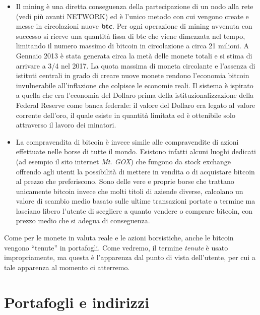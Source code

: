 \begin{itemize}
\item
  Il mining è una diretta conseguenza della partecipazione di un nodo   alla rete (vedi più avanti NETWORK) ed è l'unico metodo con cui   vengono create e messe in circolazioni nuove \textbf{btc}. Per ogni   operazione di mining avvenuta con successo si riceve una quantità   fissa di btc che viene dimezzata nel tempo, limitando il numero   massimo di bitcoin in circolazione a circa 21 milioni. A Gennaio 2013   è stata generata circa la metà delle monete totali e si stima di   arrivare a 3/4 nel 2017. La quota massima di moneta circolante e   l'assenza di istituti centrali in grado di creare nuove monete rendono   l'economia bitcoin invulnerabile all'inflazione che colpisce le   economie reali. Il sistema è ispirato a quella che era l'economia del   Dollaro prima della istituzionalizzazione della Federal Reserve come   banca federale: il valore del Dollaro era legato al valore corrente   dell'oro, il quale esiste in quantità limitata ed è ottenibile solo   attraverso il lavoro dei minatori.
\item
  La compravendita di bitcoin è invece simile alle compravendite di   azioni effettuate nelle borse di tutte il mondo. Esistono infatti   alcuni luoghi dedicati (ad esempio il sito internet \emph{Mt. GOX})   che fungono da stock exchange offrendo agli utenti la possibilità di   mettere in vendita o di acquistare bitcoin al prezzo che preferiscono.   Sono delle vere e proprie borse che trattano unicamente bitcoin invece   che molti titoli di aziende diverse, calcolano un valore di scambio   medio basato sulle ultime transazioni portate a termine ma lasciano   libero l'utente di scegliere a quanto vendere o comprare bitcoin, con   prezzo medio che si adegua di conseguenza.
\end{itemize}

Come per le monete in valuta reale e le azioni borsistiche, anche le bitcoin vengono ``tenute'' in portafogli. Come vedremo, il termine \emph{tenute} è usato impropriamente, ma questa è l'apparenza dal punto di vista dell'utente, per cui a tale apparenza al momento ci atterremo.

\section{Portafogli e indirizzi}\label{portafogli-e-indirizzi}

